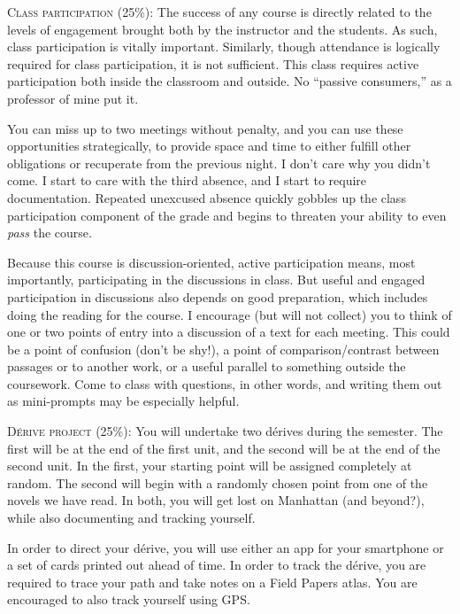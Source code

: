 \begin{description}

  \item \textsc{Class participation (25\%):} The success of any course is
    directly related to the levels of engagement brought both by the instructor
    and the students. As such, class participation is vitally important.
    Similarly, though attendance is logically required for class participation,
    it is not sufficient. This class requires active participation both inside
    the classroom and outside. No “passive consumers,” as a professor of mine
    put it. 
    
    You can miss up to two meetings without penalty, and you can use these
    opportunities strategically, to provide space and time to either fulfill
    other obligations or recuperate from the previous night. I don’t care why
    you didn’t come. I start to care with the third absence, and I start to
    require documentation. Repeated unexcused absence quickly gobbles up the
    class participation component of the grade and begins to threaten your
    ability to even \textit{pass} the course.

    Because this course is discussion-oriented, active participation means,
    most importantly, participating in the discussions in class. But useful and
    engaged participation in discussions also depends on good preparation,
    which includes doing the reading for the course. I encourage (but will not
    collect) you to think of one or two points of entry into a discussion of a
    text for each meeting. This could be a point of confusion (don’t be shy!),
    a point of comparison/contrast between passages or to another work, or a
    useful parallel to something outside the coursework. Come to class with
    questions, in other words, and writing them out as mini-prompts may be
    especially helpful.

  \item \textsc{Dérive project (25\%):} You will undertake two dérives during
    the semester. The first will be at the end of the first unit, and the
    second will be at the end of the second unit. In the first, your starting
    point will be assigned completely at random. The second will begin with a
    randomly chosen point from one of the novels we have read. In both, you
    will get lost on Manhattan (and beyond?), while also documenting and
    tracking yourself.
    
    In order to direct your dérive, you will use either an app for your
    smartphone or a set of cards printed out ahead of time. In order to track
    the dérive, you are required to trace your path and take notes on a Field
    Papers atlas. You are encouraged to also track yourself using GPS.


\end{description}

